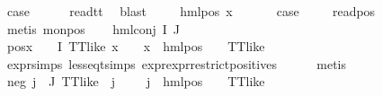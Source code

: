 \begin{isabellebody}
\ {\isacharquery}{\kern0pt}case\isanewline
\ \ \ \ \isamarkupfalse%
\ read{\isacharunderscore}{\kern0pt}tt\ \isamarkupfalse%
\ blast\ \isanewline
{}\isamarkupfalse%
\isanewline
\ \ \isamarkupfalse%
\ {\isacharparenleft}{\kern0pt}hml{\isacharunderscore}{\kern0pt}pos\ x{}\ {\isasymphi}{\isacharparenright}{\kern0pt}\isanewline
\ \ \isamarkupfalse%
\ \isamarkupfalse%
\ {\isacharquery}{\kern0pt}case\ \isanewline
\ \ \isamarkupfalse%
\ read{\isacharunderscore}{\kern0pt}pos\isanewline
\ \ \isamarkupfalse%
\ {\isacharparenleft}{\kern0pt}metis\ mon{\isacharunderscore}{\kern0pt}pos{\isacharparenright}{\kern0pt}\isanewline
{}\isamarkupfalse%
\isanewline
\ \ \isamarkupfalse%
\ {\isacharparenleft}{\kern0pt}hml{\isacharunderscore}{\kern0pt}conj\ I\ J\ {\isasymPhi}{\isacharparenright}{\kern0pt}\isanewline
\ \ \isamarkupfalse%
\ pos{\isacharcolon}{\kern0pt}{\isachardoublequoteopen}{\isacharparenleft}{\kern0pt}{\isasymforall}x\ {\isasymin}\ {\isacharparenleft}{\kern0pt}{\isasymPhi}\ {\isacharbackquote}{\kern0pt}\ I{\isacharparenright}{\kern0pt}{\isachardot}{\kern0pt}\ TT{\isacharunderscore}{\kern0pt}like\ x\ {\isasymor}\ {\isacharparenleft}{\kern0pt}{\isasymexists}{\isasymalpha}\ {\isasymchi}{\isachardot}{\kern0pt}\ x\ {\isacharequal}{\kern0pt}\ hml{\isacharunderscore}{\kern0pt}pos\ {\isasymalpha}\ {\isasymchi}\ {\isasymand}\ TT{\isacharunderscore}{\kern0pt}like\ {\isasymchi}{\isacharparenright}{\kern0pt}{\isacharparenright}{\kern0pt}{\isachardoublequoteclose}\isanewline
\ \ \ \ \isamarkupfalse%
\ expr{\isachardot}{\kern0pt}simps\ less{\isacharunderscore}{\kern0pt}eq{\isacharunderscore}{\kern0pt}t{\isachardot}{\kern0pt}simps\ expr{\isacharunderscore}{\kern0pt}{}{\isacharunderscore}{\kern0pt}expr{\isacharunderscore}{\kern0pt}{}{\isacharunderscore}{\kern0pt}restrict{\isacharunderscore}{\kern0pt}positives\isanewline
\ \ \ \ \isamarkupfalse%
\ metis\isanewline
\ \ \isamarkupfalse%
\ neg{\isacharcolon}{\kern0pt}\ {\isachardoublequoteopen}{\isacharparenleft}{\kern0pt}{\isasymforall}j\ {\isasymin}\ J{\isachardot}{\kern0pt}\ {\isacharparenleft}{\kern0pt}TT{\isacharunderscore}{\kern0pt}like\ {\isacharparenleft}{\kern0pt}{\isasymPhi}\ j{\isacharparenright}{\kern0pt}{\isacharparenright}{\kern0pt}\ {\isasymor}\ {\isacharparenleft}{\kern0pt}{\isasymexists}{\isasymalpha}\ {\isasymchi}{\isachardot}{\kern0pt}\ {\isacharparenleft}{\kern0pt}{\isacharparenleft}{\kern0pt}{\isasymPhi}\ j{\isacharparenright}{\kern0pt}\ {\isacharequal}{\kern0pt}\ hml{\isacharunderscore}{\kern0pt}pos\ {\isasymalpha}\ {\isasymchi}\ {\isasymand}\ {\isacharparenleft}{\kern0pt}TT{\isacharunderscore}{\kern0pt}like\ {\isasymchi}{\isacharparenright}{\kern0pt}{\isacharparenright}{\kern0pt}{\isacharparenright}{\kern0pt}{\isacharparenright}{\kern0pt}{\isachardoublequoteclose}\isanewline

\end{isabellebody}
